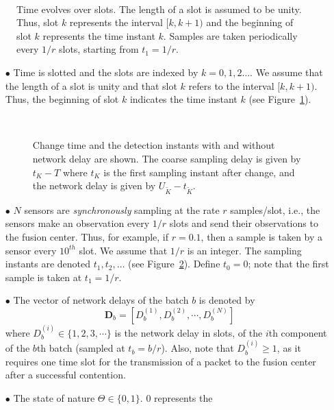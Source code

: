 \documentclass[acmtosn]{acmtrans2m}
\begin{document}
 \begin{figure}[t]
   \centering \
   \caption{Time evolves over slots. The length of a 
   slot is assumed to be unity. Thus, slot $k$ represents the interval 
   $[k,k+1)$ and the beginning of slot $k$ represents the time instant $k$.
   Samples are taken periodically every $1/r$ slots, starting from $t_1 = 1/r$.
   }
   \label{fig:slot-structure}
 \end{figure}

\begin{itemize}
\item[$\bullet$] Time is slotted and the slots are indexed by $k = 0,1,2\ldots$.
     We assume that the length of a slot is unity and that slot $k$ refers
     to the interval $[k,k+1)$.	Thus, the beginning of slot $k$ indicates the 
     time instant $k$ (see Figure~\ref{fig:slot-structure}).
 \begin{figure}[t]
   \centering \
   \caption{Change time and the detection instants with and without
     network delay are shown. The coarse sampling delay is given by 
     $t_K - T$ where $t_K$ is the first sampling instant after change, 
     and the network delay is given by $U_{\tilde{K}} -
t_{\tilde{K}}$.}
   \label{fig:queueing_decision_instants}
 \end{figure}
\item[$\bullet$] $N$ sensors are \emph{synchronously} sampling at the rate $r$
  samples/slot, i.e., the sensors make an observation every $1/r$
  slots and send their observations to the fusion center. Thus, for
  example, if $r=0.1$, then a sample is taken by a sensor every $10^{th}$ slot. We
  assume that $1/r$ is an integer. The sampling instants are denoted
  $t_1, t_2,\ldots$ (see Figure~\ref{fig:queueing_decision_instants}).
  Define $t_0=0$; note that the first sample is taken at $t_1 = 1/r$.
\item[$\bullet$] The vector of network delays of the batch $b$ is denoted by
  \[\mathbf{D}_b =\left[D^{(1)}_b,D^{(2)}_b, \cdots, D^{(N)}_b\right]\]
  where $D^{(i)}_b \in \{1,2,3,\cdots\}$ is the network delay in slots,
  of the $i$th component of the $b$th batch (sampled at $t_b = b/r$). 
  Also, note that $D_b^{(i)} \geqslant 1$, as it requires one time slot for the 
  transmission of a packet to the fusion center after a successful contention.
\item[$\bullet$] The state of nature $\Theta \in \{0,1\}$. $0$ represents the 

\end{itemize}
\end{document}
